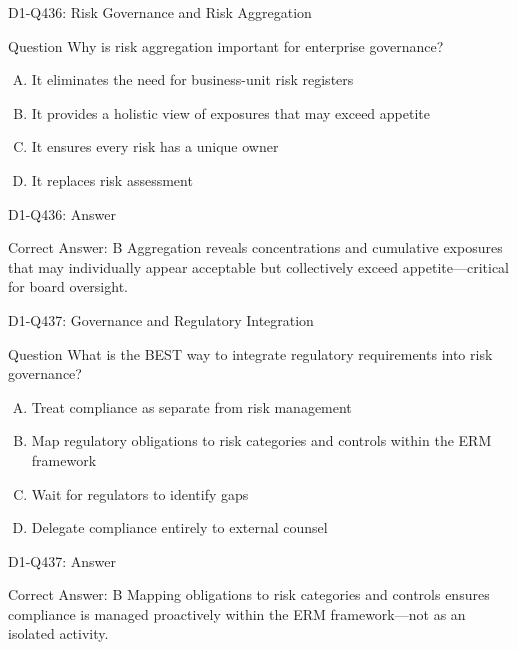 \documentclass{beamer}
\begin{document}
\begin{frame}{D1-Q436: Risk Governance and Risk Aggregation}
	\begin{block}{Question}
		Why is risk aggregation important for enterprise governance?
	\end{block}
	\begin{enumerate}[(A)]
		\item It eliminates the need for business-unit risk registers
		\item It provides a holistic view of exposures that may exceed appetite
		\item It ensures every risk has a unique owner
		\item It replaces risk assessment
	\end{enumerate}
\end{frame}
\begin{frame}{D1-Q436: Answer}
	\begin{block}{Correct Answer: B}
		Aggregation reveals concentrations and cumulative exposures that may individually appear acceptable but collectively exceed appetite—critical for board oversight.
	\end{block}
\end{frame}

\begin{frame}{D1-Q437: Governance and Regulatory Integration}
	\begin{block}{Question}
		What is the BEST way to integrate regulatory requirements into risk governance?
	\end{block}
	\begin{enumerate}[(A)]
		\item Treat compliance as separate from risk management
		\item Map regulatory obligations to risk categories and controls within the ERM framework
		\item Wait for regulators to identify gaps
		\item Delegate compliance entirely to external counsel
	\end{enumerate}
\end{frame}
\begin{frame}{D1-Q437: Answer}
	\begin{block}{Correct Answer: B}
		Mapping obligations to risk categories and controls ensures compliance is managed proactively within the ERM framework—not as an isolated activity.
	\end{block}
\end{frame}
\end{document}
